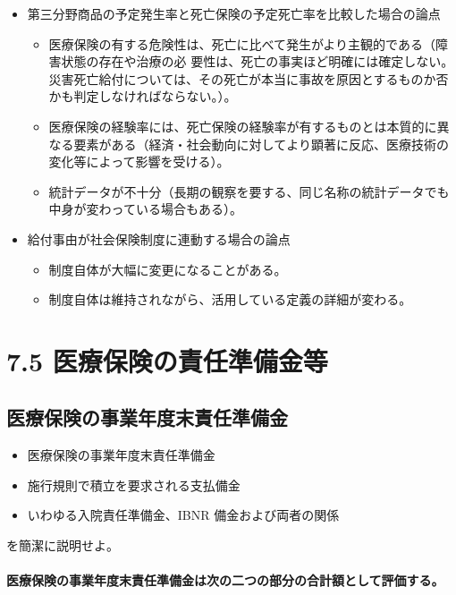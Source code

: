\documentclass[report,gutter=10mm,fore-edge=10mm,uplatex,dvipdfmx]{jlreq}
\begin{document}
\begin{itemize}
 \item 第三分野商品の予定発生率と死亡保険の予定死亡率を比較した場合の論点
\begin{itemize}
 \item 医療保険の有する危険性は、死亡に比べて発生がより主観的である（障害状態の存在や治療の必
要性は、死亡の事実ほど明確には確定しない。災害死亡給付については、その死亡が本当に事故を原因とするものか否かも判定しなければならない。）。
 \item 医療保険の経験率には、死亡保険の経験率が有するものとは本質的に異なる要素がある（経済・社会動向に対してより顕著に反応、医療技術の変化等によって影響を受ける）。
 \item 統計データが不十分（長期の観察を要する、同じ名称の統計データでも中身が変わっている場合もある）。
\end{itemize}
 \item 給付事由が社会保険制度に連動する場合の論点
\begin{itemize}
 \item 制度自体が大幅に変更になることがある。
 \item 制度自体は維持されながら、活用している定義の詳細が変わる。
\end{itemize}
\end{itemize}
\section{7.5 医療保険の責任準備金等}
\subsection{医療保険の事業年度末責任準備金}


\begin{itemize}
\item  医療保険の事業年度末責任準備金
\item  施行規則で積立を要求される支払備金
\item  いわゆる入院責任準備金、IBNR 備金および両者の関係
\end{itemize}

を簡潔に説明せよ。


\paragraph{医療保険の事業年度末責任準備金は次の二つの部分の合計額として評価する。}
\end{document}
